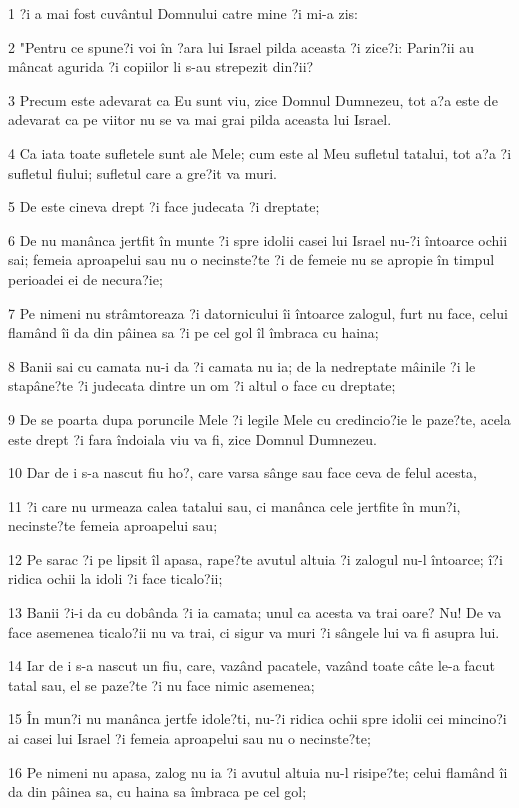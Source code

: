 \par 1 ?i a mai fost cuvântul Domnului catre mine ?i mi-a zis:
\par 2 "Pentru ce spune?i voi în ?ara lui Israel pilda aceasta ?i zice?i: Parin?ii au mâncat agurida ?i copiilor li s-au strepezit din?ii?
\par 3 Precum este adevarat ca Eu sunt viu, zice Domnul Dumnezeu, tot a?a este de adevarat ca pe viitor nu se va mai grai pilda aceasta lui Israel.
\par 4 Ca iata toate sufletele sunt ale Mele; cum este al Meu sufletul tatalui, tot a?a ?i sufletul fiului; sufletul care a gre?it va muri.
\par 5 De este cineva drept ?i face judecata ?i dreptate;
\par 6 De nu manânca jertfit în munte ?i spre idolii casei lui Israel nu-?i întoarce ochii sai; femeia aproapelui sau nu o necinste?te ?i de femeie nu se apropie în timpul perioadei ei de necura?ie;
\par 7 Pe nimeni nu strâmtoreaza ?i datornicului îi întoarce zalogul, furt nu face, celui flamând îi da din pâinea sa ?i pe cel gol îl îmbraca cu haina;
\par 8 Banii sai cu camata nu-i da ?i camata nu ia; de la nedreptate mâinile ?i le stapâne?te ?i judecata dintre un om ?i altul o face cu dreptate;
\par 9 De se poarta dupa poruncile Mele ?i legile Mele cu credincio?ie le paze?te, acela este drept ?i fara îndoiala viu va fi, zice Domnul Dumnezeu.
\par 10 Dar de i s-a nascut fiu ho?, care varsa sânge sau face ceva de felul acesta,
\par 11 ?i care nu urmeaza calea tatalui sau, ci manânca cele jertfite în mun?i, necinste?te femeia aproapelui sau;
\par 12 Pe sarac ?i pe lipsit îl apasa, rape?te avutul altuia ?i zalogul nu-l întoarce; î?i ridica ochii la idoli ?i face ticalo?ii;
\par 13 Banii ?i-i da cu dobânda ?i ia camata; unul ca acesta va trai oare? Nu! De va face asemenea ticalo?ii nu va trai, ci sigur va muri ?i sângele lui va fi asupra lui.
\par 14 Iar de i s-a nascut un fiu, care, vazând pacatele, vazând toate câte le-a facut tatal sau, el se paze?te ?i nu face nimic asemenea;
\par 15 În mun?i nu manânca jertfe idole?ti, nu-?i ridica ochii spre idolii cei mincino?i ai casei lui Israel ?i femeia aproapelui sau nu o necinste?te;
\par 16 Pe nimeni nu apasa, zalog nu ia ?i avutul altuia nu-l risipe?te; celui flamând îi da din pâinea sa, cu haina sa îmbraca pe cel gol;
